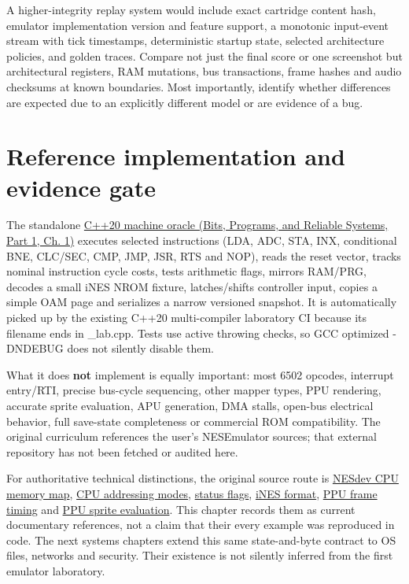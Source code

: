 A higher-integrity replay system would include exact cartridge content hash, emulator implementation version and feature support, a monotonic input-event stream with tick timestamps, deterministic startup state, selected architecture policies, and golden traces. Compare not just the final score or one screenshot but architectural registers, RAM mutations, bus transactions, frame hashes and audio checksums at known boundaries. Most importantly, identify whether differences are expected due to an explicitly different model or are evidence of a bug.

\section{Reference implementation and evidence gate}\label{01-foundations-i-ch016-reference-implementation-and-evidence-gate}

\hypertarget{01-foundations-i-ch016-reference-implementation-and-evidence-gate}{}

The standalone \href{../01-Bits-Programs-and-Reliable-Systems-P01/main.pdf\#source-file-552a9e2296dc984412c8f06d}{C++20 machine oracle (Bits, Programs, and Reliable Systems, Part 1, Ch. 1)} executes selected instructions (LDA, ADC, STA, INX, conditional BNE, CLC/SEC, CMP, JMP, JSR, RTS and NOP), reads the reset vector, tracks nominal instruction cycle costs, tests arithmetic flags, mirrors RAM/PRG, decodes a small iNES NROM fixture, latches/shifts controller input, copies a simple OAM page and serializes a narrow versioned snapshot. It is automatically picked up by the existing C++20 multi-compiler laboratory CI because its filename ends in \_lab.cpp. Tests use active throwing checks, so GCC optimized -DNDEBUG does not silently disable them.

What it does \textbf{not} implement is equally important: most 6502 opcodes, interrupt entry/RTI, precise bus-cycle sequencing, other mapper types, PPU rendering, accurate sprite evaluation, APU generation, DMA stalls, open-bus electrical behavior, full save-state completeness or commercial ROM compatibility. The original curriculum references the user's NESEmulator sources; that external repository has not been fetched or audited here.

For authoritative technical distinctions, the original source route is \href{https://www.nesdev.org/wiki/CPU_memory_map}{NESdev CPU memory map}, \href{https://www.nesdev.org/wiki/Addressing_modes}{CPU addressing modes}, \href{https://www.nesdev.org/wiki/Status_flag}{status flags}, \href{https://www.nesdev.org/wiki/INES}{iNES format}, \href{https://www.nesdev.org/wiki/PPU_frame_timing}{PPU frame timing} and \href{https://www.nesdev.org/wiki/PPU_sprite_evaluation}{PPU sprite evaluation}. This chapter records them as current documentary references, not a claim that their every example was reproduced in code. The next systems chapters extend this same state-and-byte contract to OS files, networks and security. Their existence is not silently inferred from the first emulator laboratory.

